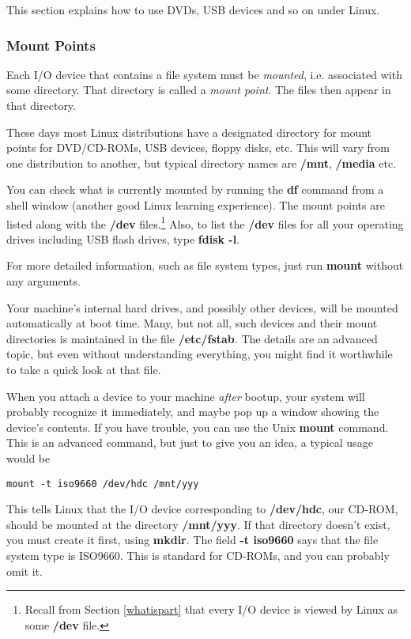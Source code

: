 \documentclass[11pt]{article}
\begin{document}
This section explains how to use DVDs, USB devices and so on under
Linux.

\subsubsection{Mount Points}

Each I/O device that contains a file system must be {\it mounted}, i.e.
associated with some directory.  That directory is called a {\it mount
point}.  The files then appear in that directory.

These days most Linux distributions have a designated directory for
mount points for DVD/CD-ROMs, USB devices, floppy disks, etc.  This will
vary from one distribution to another, but typical directory names are
{\bf /mnt}, {\bf /media} etc.

You can check what is currently mounted by running the {\bf df} command
from a shell window (another good Linux learning experience).  The mount
points are listed along with the {\bf /dev} files.\footnote{Recall from
Section \ref{whatispart} that every I/O device is viewed by Linux as
some {\bf /dev} file.}  Also, to list the {\bf /dev} files for all your
operating drives including USB flash drives, type {\bf fdisk -l}.

For more detailed information, such as file system types, just run {\bf
mount} without any arguments.

Your machine's internal hard drives, and possibly other devices, will be
mounted automatically at boot time.  Many, but not all, such devices and
their mount directories is maintained in the file {\bf /etc/fstab}.  The
details are an advanced topic, but even without understanding
everything, you might find it worthwhile to take a quick look at that
file.  

When you attach a device to your machine {\it after} bootup, your system
will probably recognize it immediately, and maybe pop up a window
showing the device's contents.  If you have trouble, you can use the
Unix {\bf mount} command.  This is an advanced command, but just to give
you an idea, a typical usage would be

\begin{Verbatim}[fontsize=\relsize{-2}]
mount -t iso9660 /dev/hdc /mnt/yyy
\end{Verbatim}

This tells Linux that the I/O device corresponding to {\bf /dev/hdc},
our CD-ROM, should be mounted at the directory {\bf /mnt/yyy}.
If that directory doesn't exist, you must create it first, using {\bf
mkdir}.  The field {\bf -t iso9660} says that the file system type is
ISO9660.  This is standard for CD-ROMs, and you can probably omit it.
\end{document}
